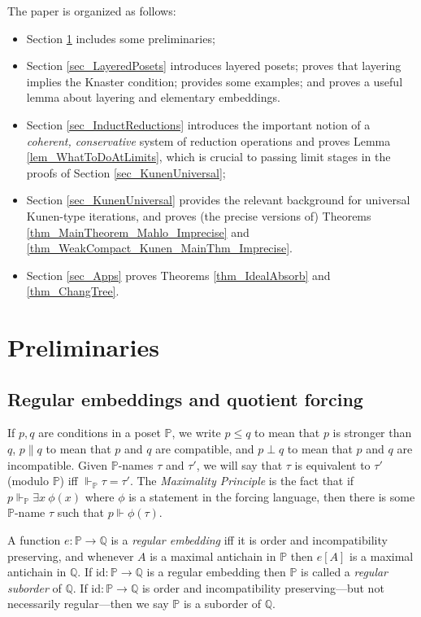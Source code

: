 \documentclass{amsart}
\begin{document}
The paper is organized as follows:  
\begin{itemize}
 \item Section \ref{sec_Prelims} includes some preliminaries;
 \item Section \ref{sec_LayeredPosets} introduces layered posets; proves that layering implies the Knaster condition; provides some examples; and proves a useful lemma about layering and elementary embeddings. 
 \item Section \ref{sec_InductReductions} introduces the important notion of a \emph{coherent, conservative} system of reduction operations and proves Lemma \ref{lem_WhatToDoAtLimits}, which is crucial to passing limit stages in the proofs of Section \ref{sec_KunenUniversal};
 \item Section \ref{sec_KunenUniversal} provides the relevant background for universal Kunen-type iterations, and proves (the precise versions of) Theorems \ref{thm_MainTheorem_Mahlo_Imprecise} and \ref{thm_WeakCompact_Kunen_MainThm_Imprecise}.
 \item Section \ref{sec_Apps} proves Theorems \ref{thm_IdealAbsorb} and \ref{thm_ChangTree}.
\end{itemize}


\section{Preliminaries}\label{sec_Prelims}

\subsection{Regular embeddings and quotient forcing}

If $p,q$ are conditions in a poset $\mathbb{P}$, we write $p \le q$ to mean that $p$ is stronger than $q$, $p \parallel q$ to mean that $p$ and $q$ are compatible, and $p \perp q$ to mean that $p$ and $q$ are incompatible.  Given $\mathbb{P}$-names $\tau$ and $\tau'$, we will say that $\tau$ is equivalent to $\tau'$ (modulo $\mathbb{P}$) iff $\Vdash_{\mathbb{P}} \tau = \tau'$.  The \emph{Maximality Principle} is the fact that if $p \Vdash_{\mathbb{P}} \exists x \ \phi(x)$ where $\phi$ is a statement in the forcing language, then there is some $\mathbb{P}$-name $\tau$ such that $p \Vdash \phi(\tau)$.


A function $e: \mathbb{P} \to \mathbb{Q}$ is a \emph{regular embedding} iff it is order and incompatibility preserving, and whenever $A$ is a maximal antichain in $\mathbb{P}$ then $e[A]$ is a maximal antichain in $\mathbb{Q}$.  If $\text{id}: \mathbb{P} \to \mathbb{Q}$ is a regular embedding then $\mathbb{P}$ is called a \emph{regular suborder} of $\mathbb{Q}$.  If $\text{id}:\mathbb{P} \to \mathbb{Q}$ is order and incompatibility preserving---but not necessarily regular---then we say $\mathbb{P}$ is a suborder of $\mathbb{Q}$.
\end{document}
